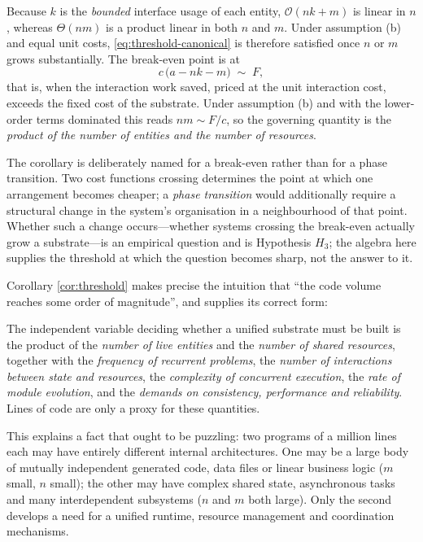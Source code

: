 \begin{corollary}\label{cor:threshold}
Because $k$ is the \emph{bounded} interface usage of each entity, $\mathcal{O}(nk + m)$ is
linear in $n$, whereas $\Theta(nm)$ is a product linear in both $n$ and $m$. Under assumption (b)
and equal unit costs, \eqref{eq:threshold-canonical} is therefore satisfied once $n$ or $m$ grows
substantially. The break-even point is at
\[
c\,\bigl(a - n k - m\bigr) \;\sim\; F,
\]
that is, when the interaction work saved, priced at the unit interaction cost, exceeds the fixed
cost of the substrate. Under assumption (b) and with the lower-order terms dominated this reads
$n m \sim F/c$, so the governing quantity is the \emph{product of the number of entities and the
number of resources}.
\end{corollary}

The corollary is deliberately named for a break-even rather than for a phase transition. Two cost
functions crossing determines the point at which one arrangement becomes cheaper; a \emph{phase
transition} would additionally require a structural change in the system's organisation in a
neighbourhood of that point. Whether such a change occurs---whether systems crossing the break-even
actually grow a substrate---is an empirical question and is Hypothesis $H_3$; the algebra here
supplies the threshold at which the question becomes sharp, not the answer to it.

Corollary \ref{cor:threshold} makes precise the intuition that ``the code volume reaches
some order of magnitude'', and supplies its correct form:

\begin{principle}\label{pr:notloc}
The independent variable deciding whether a unified substrate must be built is the product
of the \emph{number of live entities} and the \emph{number of shared resources}, together
with the \emph{frequency of recurrent problems}, the \emph{number of interactions between
state and resources}, the \emph{complexity of concurrent execution}, the \emph{rate of
module evolution}, and the \emph{demands on consistency, performance and reliability}.
Lines of code are only a proxy for these quantities.
\end{principle}

This explains a fact that ought to be puzzling: two programs of a million lines each may
have entirely different internal architectures. One may be a large body of mutually
independent generated code, data files or linear business logic ($m$ small, $n$ small); the
other may have complex shared state, asynchronous tasks and many interdependent subsystems
($n$ and $m$ both large). Only the second develops a need for a unified runtime, resource
management and coordination mechanisms.

